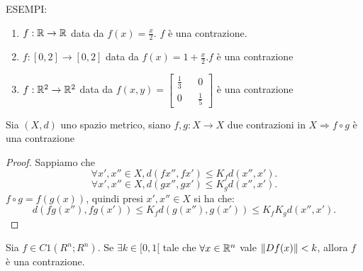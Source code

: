 ESEMPI:\\
\begin{enumerate}
	\item $f: \mathbb{R} \rightarrow \mathbb{R}$ data da $f(x) = \frac{x}{2}$. $f$ è una contrazione.
	\item $f: [0,2] \rightarrow [0,2]$ data da $f(x) = 1+\frac{x}{2}. f$ è una contrazione
	\item $f: \mathbb{R}^2 \rightarrow \mathbb{R}^2$ data da $f(x,y)=\begin{bmatrix} \frac{1}{3}&&0\\0&&\frac{1}{5}\end{bmatrix}$ è una contrazione
\end{enumerate}

\proposition
Sia $(X, d)$ uno spazio metrico, siano $f,g:X\rightarrow X$ due contrazioni in $X \Rightarrow f\circ g$ è una contrazione
\begin{proof}
	Sappiamo che\\
	$$\forall x',x''\in X, d(fx'', fx')\le K_fd(x'', x').$$
	$$\forall x',x''\in X, d(gx'', gx')\le K_gd(x'', x').$$
	$f\circ g=f(g(x))$, quindi presi $x',x''\in X$ si ha che: $$d(fg(x''), fg(x'))\le K_fd(g(x''), g(x'))\le K_fK_gd(x'',x').$$
\end{proof}

\proposition
Sia $f \in C1(R^n;R^n)$. Se $\exists k \in [0, 1[$ tale che $\forall x \in \mathbb{R}^n$ vale $\left\|Df(x)\right\|  < k$, allora $f$ è una contrazione.


